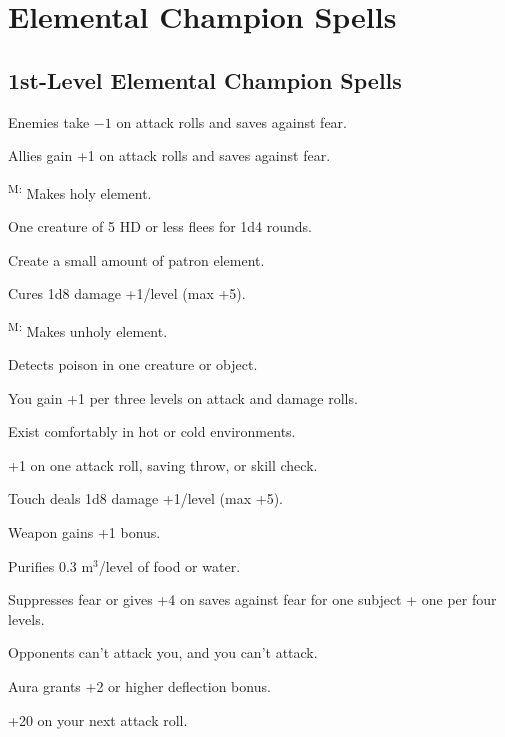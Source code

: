 \section{Elemental Champion Spells}




\subsection{1st-Level Elemental Champion Spells}

 Enemies take $-1$ on attack rolls and saves against fear.

 Allies gain +1 on attack rolls and saves against fear.

\textsuperscript{M:} Makes holy element. %

 One creature of 5 HD or less flees for 1d4 rounds.

 Create a small amount of patron element. %

 Cures 1d8 damage +1/level (max +5).

\textsuperscript{M:} Makes unholy element. %

 Detects poison in one creature or object.

 You gain +1 per three levels on attack and damage rolls.

 Exist comfortably in hot or cold environments.

 +1 on one attack roll, saving throw, or skill check.

 Touch deals 1d8 damage +1/level (max +5).

 Weapon gains +1 bonus.

 Purifies 0.3 m$^3$/level of food or water.

 Suppresses fear or gives +4 on saves against fear for one subject + one per four levels.

 Opponents can't attack you, and you can't attack.

 Aura grants +2 or higher deflection bonus.

 +20 on your next attack roll.




